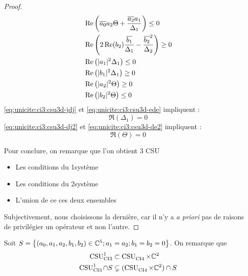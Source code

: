 \begin{proof}
\begin{minipage}{0.49\textwidth}
\begin{align}
        \label{eq:unicite:ci3:csu3d-jrj}&\Re\left(\conj{a_0}a_2\Theta + \frac{\conj{a_2}a_1}{\Delta_1} \right)\le 0\\
        \label{eq:unicite:ci3:csu3d-ere}&\Re\left(2\Re(b_2)\frac{\conj{b_1}}{\Delta_1}-\frac{\conj{b_2}^2}{\Delta_2}\right) \ge 0\\
        \label{eq:unicite:ci3:csu3d-jdj}&\Re\left(|a_1|^2\Delta_1\right) \le 0 \\
        \label{eq:unicite:ci3:csu3d-ede}&\Re\left(|b_1|^2\Delta_1\right) \ge 0 \\
        \label{eq:unicite:ci3:csu3d-dj2}&\Re\left(|a_2|^2\Theta\right)\ge 0\\
        \label{eq:unicite:ci3:csu3d-de2}&\Re\left(|b_2|^2\Theta\right)\le 0
      \end{align}
      \eqref{eq:unicite:ci3:csu3d-jdj} et \eqref{eq:unicite:ci3:csu3d-ede} impliquent :
      \begin{equation}
        \Re\left(\Delta_1\right) = 0
      \end{equation}
      \eqref{eq:unicite:ci3:csu3d-dj2} et \eqref{eq:unicite:ci3:csu3d-de2} impliquent :
      \begin{equation}
        \Re\left(\Theta\right) = 0
      \end{equation}
    \end{minipage}

    Pour conclure, on remarque que l'on obtient 3 CSU
    \begin{itemize}
      \item Les conditions du 1\ier système
      \item Les conditions du 2\ieme système
      \item L'union de ce ces deux ensembles
    \end{itemize}

    Subjectivement, nous choisissons la dernière, car il n'y a \textit{a priori} pas de raisons de privilégier un opérateur et non l'autre.
  \end{proof}

  Soit \(S = \left\lbrace (a_0,a_1,a_2,b_1,b_2) \in \CC^5 ; a_1 = a_2 ; b_1 = b_2 = 0 \right\rbrace \). On remarque que
  \begin{align}
    \CSU[1]{CI3} & \subset \CSU{CI4}\times\CC^2
    \\
    \CSU[1]{CI3}\cap S & \subsetneq (\CSU{CI4}\times\CC^2)\cap S 
  \end{align}


